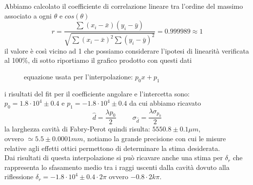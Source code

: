 \documentclass{article}
\theoremstyle{definition}
\begin{document}
\begin{figure}[!htbp]
    	\captionsetup{labelformat=empty}
    \end{figure}

\noindent Abbiamo calcolato il coefficiente di correlazione lineare tra l'ordine del massimo associato a ogni \(\theta\) e \(cos(\theta)\)
\[r = \frac{\sum (x_{i} - \bar{x})(y_{i} - \bar{y})}{\sqrt{\sum (x_{i} - \bar{x})^{2}\sum (y_{i} - \bar{y})^{2}}} = 0.999989 \approx 1\]
il valore è così vicino ad 1 che possiamo considerare l'ipotesi di linearità verificata al 100\%, di sotto riportiamo il grafico prodotto con questi dati

\pagebreak

\begin{figure}[!ht]
    	\captionsetup{labelformat=empty}
    \caption{equazione usata per l'interpolazione: \(p_{0} x + p_{1}\)}
\end{figure}

i risultati del fit per il coefficiente angolare e l'intercetta sono:\\ \(p_{0} = 1.8 \cdot 10^{4} \pm 0.4\) e \(p_{1} = -1.8 \cdot 10^{4} \pm 0.4\) da cui abbiamo ricavato 
\[\hat{d} = \frac{\lambda p_{0}}{2} \hspace{1cm} \sigma_{\hat{d}} = \frac{\lambda \sigma_{p_{0}}}{2}\]
la larghezza cavità di Fabry-Perot quindi risulta: \(5550.8 \pm 0.1 \mu m\),\\ovvero \(\simeq 5.5 \pm 0.0001 mm\), notiamo la grande precisione con cui le misure relative agli effetti ottici permettono di determinare la stima desiderata.\\
Dai risultati di questa interpolazione si può ricavare anche una stima per \(\delta_{r}\) che rappresenta lo sfasamento medio tra i raggi uscenti dalla cavità dovuto alla riflessione \(\delta_{r} = -1.8 \cdot 10^{4} \pm 0.4 \cdot 2 \pi\) ovvero \(-0.8 \cdot 2k \pi \).
\end{document}
